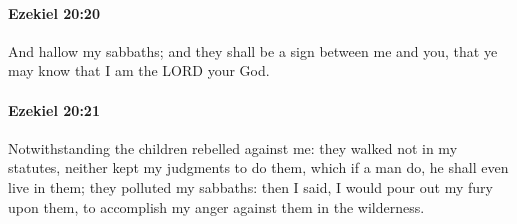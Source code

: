 		\paragraph{Ezekiel 20:20} %
			\label{EZEKIEL-20-20}

			And hallow my sabbaths; and they shall be a sign between me and you, that ye may know that I am the LORD your God.


		\paragraph{Ezekiel 20:21} %
			\label{EZEKIEL-20-21}

			Notwithstanding the children rebelled against me: they walked not in my statutes, neither kept my judgments to do them, which if a man do, he shall even live in them; they polluted my sabbaths: then I said, I would pour out my fury upon them, to accomplish my anger against them in the wilderness.

